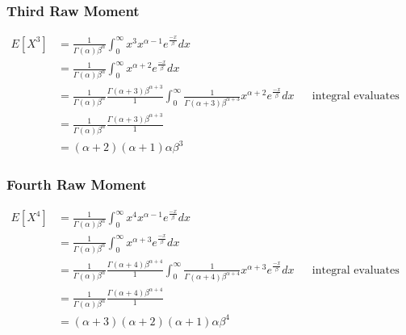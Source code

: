 \documentclass[12pt]{article}
\begin{document}
\subsubsection*{Third Raw Moment}
\begin{align*}
        E[X^3] &= \frac{1}{\Gamma(\alpha)\beta^\alpha} 
          \int_0^\infty x^3 x^{\alpha-1} e^{\frac{-x}{\beta}}dx \\
        &= \frac{1}{\Gamma(\alpha)\beta^\alpha} 
          \int_0^\infty x^{\alpha+2} e^{\frac{-x}{\beta}}dx \\
        &= \frac{1}{\Gamma(\alpha)\beta^\alpha} \frac{\Gamma(\alpha+3)\beta^{\alpha+3}}{1} 
          \int_0^\infty \frac{1}{\Gamma(\alpha+3)\beta^{\alpha+3}} x^{\alpha+2} e^{\frac{-x}{\beta}}dx & &
          \textrm{integral evaluates to 1}\\
        &= \frac{1}{\Gamma(\alpha)\beta^\alpha} \frac{\Gamma(\alpha+3)\beta^{\alpha+3}}{1} \\
        &= (\alpha + 2)(\alpha + 1)\alpha \beta^3
\end{align*}

\subsubsection*{Fourth Raw Moment}
\begin{align*}
        E[X^4] &= \frac{1}{\Gamma(\alpha)\beta^\alpha} 
          \int_0^\infty x^4 x^{\alpha-1} e^{\frac{-x}{\beta}}dx \\
        &= \frac{1}{\Gamma(\alpha)\beta^\alpha} 
          \int_0^\infty x^{\alpha+3} e^{\frac{-x}{\beta}}dx \\
        &= \frac{1}{\Gamma(\alpha)\beta^\alpha} \frac{\Gamma(\alpha+4)\beta^{\alpha+4}}{1} 
          \int_0^\infty \frac{1}{\Gamma(\alpha+4)\beta^{\alpha+4}} x^{\alpha+3} e^{\frac{-x}{\beta}}dx & &
          \textrm{integral evaluates to 1}\\
        &= \frac{1}{\Gamma(\alpha)\beta^\alpha} \frac{\Gamma(\alpha+4)\beta^{\alpha+4}}{1} \\
        &= (\alpha + 3)(\alpha + 2)(\alpha + 1)\alpha \beta^4
\end{align*}
\end{document}
